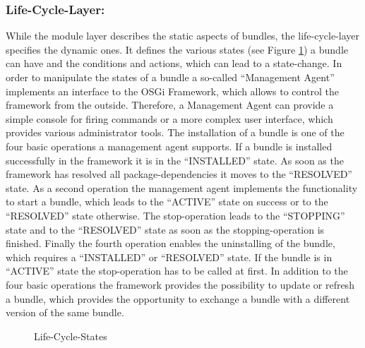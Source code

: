 \subsubsection{Life-Cycle-Layer:}
\label{label_life_cycle_layer}
While the module layer describes the static aspects of bundles, the
life-cycle-layer specifies the dynamic ones.\newline
It defines the various states (see Figure \ref{fig:life_cycle_states}) a bundle
can have and the conditions and actions, which can lead to a state-change. In order to manipulate
the states of a bundle a so-called ``Management Agent'' implements an interface to the OSGi
Framework, which allows to control the framework from the outside.
Therefore, a Management Agent can provide a simple console for firing commands or a more
complex user interface, which provides various administrator tools.\newline
The installation of a bundle is one of the four basic operations a
management agent supports. If a bundle is installed successfully in the framework it is in the
``INSTALLED'' state. As soon as the framework has resolved all
package-dependencies it moves to the ``RESOLVED'' state.\newline
As a second operation the management agent implements the functionality to
start a bundle, which leads to the ``ACTIVE'' state on success or to the
``RESOLVED'' state otherwise. The stop-operation leads to the ``STOPPING''
state and to the ``RESOLVED'' state as soon as the stopping-operation is
finished.\newline
Finally the fourth operation enables the uninstalling of the bundle, which
requires a ``INSTALLED'' or ``RESOLVED'' state. If the bundle is in ``ACTIVE''
state the stop-operation has to be called at first.\newline
In addition to the four basic operations the framework provides the
possibility to update or refresh a bundle, which provides the opportunity to
exchange a bundle with a different version of the same bundle.


\begin{figure}
	\centering
	\caption{Life-Cycle-States}
	\label{fig:life_cycle_states}
\end{figure}

